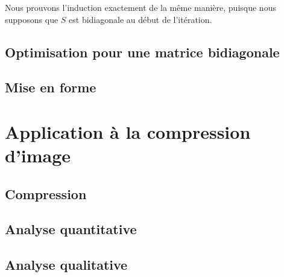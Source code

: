 \documentclass{article}
\begin{document}
\smallskip

Nous prouvons l'induction exactement de la même manière, puisque nous supposons que $S$ est bidiagonale au début de l'itération.

\subsection{Optimisation pour une matrice bidiagonale}
\label{ssec:opti_bidiag_qr}

\subsection{Mise en forme}
\label{ssec:mise_en_forme_qr}


\section{Application à la compression d'image}
\label{sec:appli_compr_img}

\subsection{Compression}
\label{ssec:compr_img}

\subsection{Analyse quantitative}
\label{ssec:quanti_img}

\subsection{Analyse qualitative}
\label{ssec:quali_img}
\end{document}
